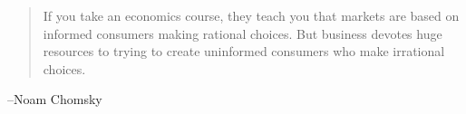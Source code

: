 \documentclass[letterpaper]{exam}
\begin{document}
  \ifprintanswers{}
  \else
    \vspace{8 cm}
    \begin{quote}
      \begin{em}
        If you take an economics course, they teach you that markets are based
        on informed consumers making rational choices.  But business devotes
        huge resources to trying to create uninformed consumers who make
        irrational choices.
      \end{em}
    \end{quote}
    \hspace{1 cm} --Noam Chomsky
  \fi
\end{document}
